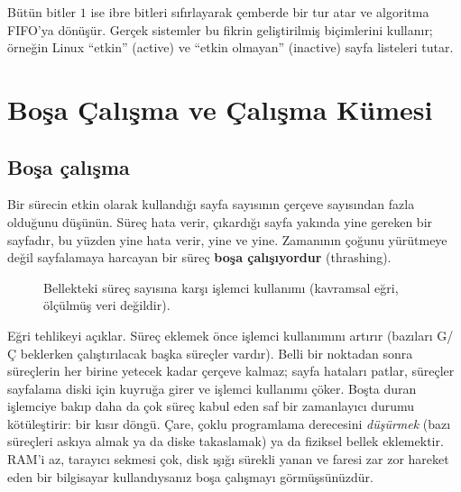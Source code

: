 \documentclass[11pt,a4paper]{article}
\newcommand{\term}[1]{\textbf{\color{mintdeep}#1}}
\begin{document}
Bütün bitler $1$ ise ibre bitleri sıfırlayarak çemberde bir tur atar ve algoritma FIFO'ya dönüşür. Gerçek sistemler bu fikrin geliştirilmiş biçimlerini kullanır; örneğin Linux ``etkin'' (active) ve ``etkin olmayan'' (inactive) sayfa listeleri tutar.

\section{Boşa Çalışma ve Çalışma Kümesi}

\subsection{Boşa çalışma}

Bir sürecin etkin olarak kullandığı sayfa sayısının çerçeve sayısından fazla olduğunu düşünün. Süreç hata verir, çıkardığı sayfa yakında yine gereken bir sayfadır, bu yüzden yine hata verir, yine ve yine. Zamanının çoğunu yürütmeye değil sayfalamaya harcayan bir süreç \term{boşa çalışıyordur} (thrashing).

\begin{figure}[H]
\centering
{}
\caption{Bellekteki süreç sayısına karşı işlemci kullanımı (kavramsal eğri, ölçülmüş veri değildir).}
\end{figure}

Eğri tehlikeyi açıklar. Süreç eklemek önce işlemci kullanımını artırır (bazıları G/Ç beklerken çalıştırılacak başka süreçler vardır). Belli bir noktadan sonra süreçlerin her birine yetecek kadar çerçeve kalmaz; sayfa hataları patlar, süreçler sayfalama diski için kuyruğa girer ve işlemci kullanımı çöker. Boşta duran işlemciye bakıp daha da çok süreç kabul eden saf bir zamanlayıcı durumu kötüleştirir: bir kısır döngü. Çare, çoklu programlama derecesini \emph{düşürmek} (bazı süreçleri askıya almak ya da diske takaslamak) ya da fiziksel bellek eklemektir. RAM'i az, tarayıcı sekmesi çok, disk ışığı sürekli yanan ve faresi zar zor hareket eden bir bilgisayar kullandıysanız boşa çalışmayı görmüşsünüzdür.
\end{document}
